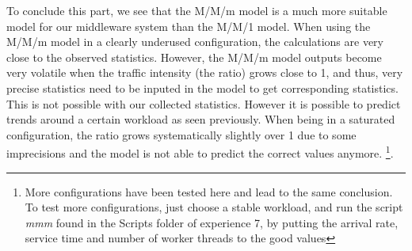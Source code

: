 \documentclass[11pt,a4paper]{article}
\begin{document}
To conclude this part, we see that the M/M/m model is a much more suitable model for our middleware system than the M/M/1 model. When using the M/M/m model in a clearly underused configuration, the calculations are very close to the observed statistics. However, the M/M/m model outputs become very volatile when the traffic intensity (the ratio) grows close to 1, and thus, very precise statistics need to be inputed in the model to get corresponding statistics. This is not possible with our collected statistics. However it is possible to predict trends around a certain workload as seen previously. When being in a saturated configuration, the ratio grows systematically slightly over 1 due to some imprecisions and the model is not able to predict the correct values anymore. \footnote{More configurations have been tested here and lead to the same conclusion. To test more configurations, just choose a stable workload, and run the script \textit{mmm} found in the Scripts folder of experience 7, by putting the arrival rate, service time and number of worker threads to the good values}.  
\end{document}
